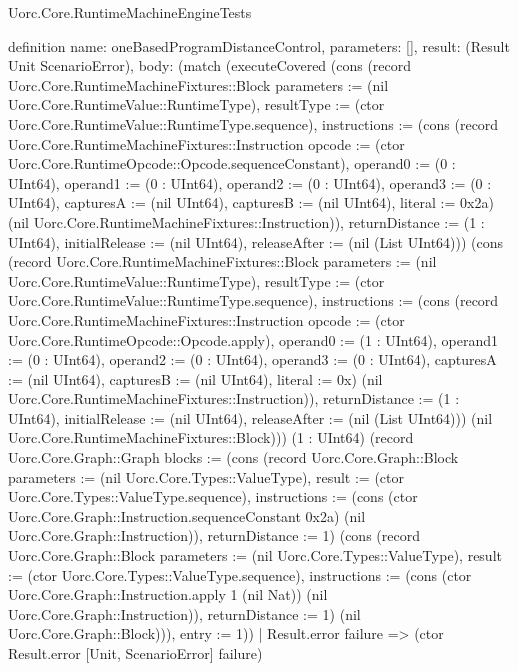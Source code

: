 \begin{lexlean}{Uorc.Core.RuntimeMachineEngineTests}
\begin{semanticmodule}
definition{
  name: oneBasedProgramDistanceControl,
  parameters: [],
  result: (Result Unit ScenarioError),
  body: (match (executeCovered (cons (record Uorc.Core.RuntimeMachineFixtures::Block {parameters := (nil Uorc.Core.RuntimeValue::RuntimeType), resultType := (ctor Uorc.Core.RuntimeValue::RuntimeType.sequence), instructions := (cons (record Uorc.Core.RuntimeMachineFixtures::Instruction {opcode := (ctor Uorc.Core.RuntimeOpcode::Opcode.sequenceConstant), operand0 := (0 : UInt64), operand1 := (0 : UInt64), operand2 := (0 : UInt64), operand3 := (0 : UInt64), capturesA := (nil UInt64), capturesB := (nil UInt64), literal := 0x2a}) (nil Uorc.Core.RuntimeMachineFixtures::Instruction)), returnDistance := (1 : UInt64), initialRelease := (nil UInt64), releaseAfter := (nil (List UInt64))}) (cons (record Uorc.Core.RuntimeMachineFixtures::Block {parameters := (nil Uorc.Core.RuntimeValue::RuntimeType), resultType := (ctor Uorc.Core.RuntimeValue::RuntimeType.sequence), instructions := (cons (record Uorc.Core.RuntimeMachineFixtures::Instruction {opcode := (ctor Uorc.Core.RuntimeOpcode::Opcode.apply), operand0 := (1 : UInt64), operand1 := (0 : UInt64), operand2 := (0 : UInt64), operand3 := (0 : UInt64), capturesA := (nil UInt64), capturesB := (nil UInt64), literal := 0x}) (nil Uorc.Core.RuntimeMachineFixtures::Instruction)), returnDistance := (1 : UInt64), initialRelease := (nil UInt64), releaseAfter := (nil (List UInt64))}) (nil Uorc.Core.RuntimeMachineFixtures::Block))) (1 : UInt64) (record Uorc.Core.Graph::Graph {blocks := (cons (record Uorc.Core.Graph::Block {parameters := (nil Uorc.Core.Types::ValueType), result := (ctor Uorc.Core.Types::ValueType.sequence), instructions := (cons (ctor Uorc.Core.Graph::Instruction.sequenceConstant 0x2a) (nil Uorc.Core.Graph::Instruction)), returnDistance := 1}) (cons (record Uorc.Core.Graph::Block {parameters := (nil Uorc.Core.Types::ValueType), result := (ctor Uorc.Core.Types::ValueType.sequence), instructions := (cons (ctor Uorc.Core.Graph::Instruction.apply 1 (nil Nat)) (nil Uorc.Core.Graph::Instruction)), returnDistance := 1}) (nil Uorc.Core.Graph::Block))), entry := 1}))
    | Result.error failure => (ctor Result.error [Unit, ScenarioError] failure)
}
\end{semanticmodule}
\end{lexlean}
